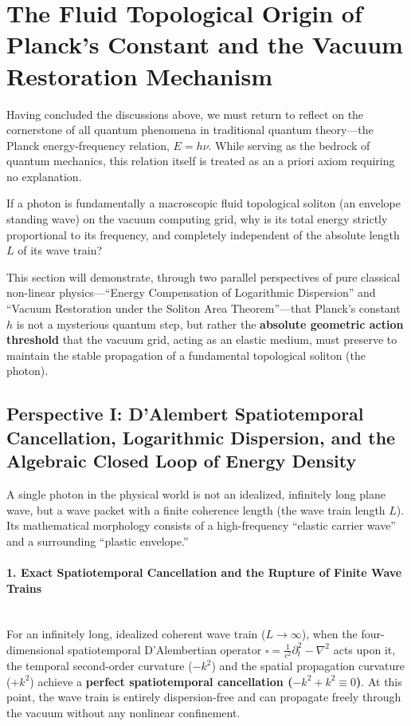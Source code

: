 \documentclass[12pt, a4paper]{article}
\begin{document}
\section{The Fluid Topological Origin of Planck's Constant and the Vacuum Restoration Mechanism}

Having concluded the discussions above, we must return to reflect on the cornerstone of all quantum phenomena in traditional quantum theory---the Planck energy-frequency relation, $E = h\nu$. While serving as the bedrock of quantum mechanics, this relation itself is treated as an a priori axiom requiring no explanation.

If a photon is fundamentally a macroscopic fluid topological soliton (an envelope standing wave) on the vacuum computing grid, why is its total energy strictly proportional to its frequency, and completely independent of the absolute length $L$ of its wave train?

This section will demonstrate, through two parallel perspectives of pure classical non-linear physics---``Energy Compensation of Logarithmic Dispersion'' and ``Vacuum Restoration under the Soliton Area Theorem''---that Planck's constant $h$ is not a mysterious quantum step, but rather the \textbf{absolute geometric action threshold} that the vacuum grid, acting as an elastic medium, must preserve to maintain the stable propagation of a fundamental topological soliton (the photon).

\subsection{Perspective I: D'Alembert Spatiotemporal Cancellation, Logarithmic Dispersion, and the Algebraic Closed Loop of Energy Density}

A single photon in the physical world is not an idealized, infinitely long plane wave, but a wave packet with a finite coherence length (the wave train length $L$). Its mathematical morphology consists of a high-frequency ``elastic carrier wave'' and a surrounding ``plastic envelope.''

\paragraph{1. Exact Spatiotemporal Cancellation and the Rupture of Finite Wave Trains} ~\\
For an infinitely long, idealized coherent wave train ($L \to \infty$), when the four-dimensional spatiotemporal D'Alembertian operator $\square = \frac{1}{c^2}\partial_t^2 - \nabla^2$ acts upon it, the temporal second-order curvature ($-k^2$) and the spatial propagation curvature ($+k^2$) achieve a \textbf{perfect spatiotemporal cancellation ($-k^2 + k^2 \equiv 0$)}. At this point, the wave train is entirely dispersion-free and can propagate freely through the vacuum without any nonlinear confinement.
\end{document}
